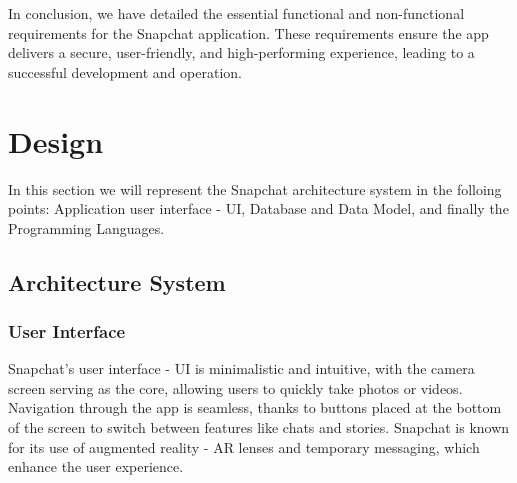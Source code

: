 \documentclass{article}
\begin{document}
In conclusion, we have detailed the essential functional and non-functional requirements for the Snapchat application. These requirements ensure the app delivers a secure, user-friendly, and high-performing experience, leading to a successful development and operation.

\newpage
\section{Design}

In this section we will represent the Snapchat architecture system in the folloing points: Application user interface - UI, Database and Data Model, and finally the Programming Languages.
\subsection{Architecture System}
\subsubsection{User Interface}
Snapchat’s user interface - UI is minimalistic and intuitive, with the camera screen serving as the core, allowing users to quickly take photos or videos. Navigation through the app is seamless, thanks to buttons placed at the bottom of the screen to switch between features like chats and stories. Snapchat is known for its use of augmented reality - AR lenses and temporary messaging, which enhance the user experience. \newline
\end{document}
